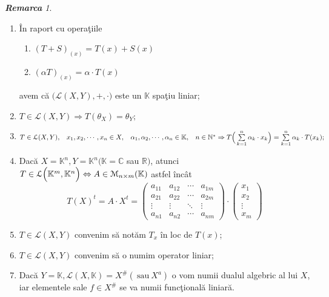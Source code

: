 \documentclass[ a4paper, 12pt]{report}
\theoremstyle{remark}
\newtheorem{remarc}{\bf Remarca}[section]
\numberwithin{equation}{section}
\begin{document}
\begin{remarc}
\begin{enumerate}
\item \^In raport cu opera\c tiile
\begin{enumerate}
\item $(T+S)_{(x)} = T(x) + S(x)$
\item $(\alpha T)_{(x)} = \alpha \cdot T(x)$
\end{enumerate} avem c\u a $\Big( \mathcal{L}(X,Y), + , \cdot\Big)$ este un $\mathbb{K}$ spa\c tiu liniar;
\item $T \in \mathcal{L}(X,Y) \Rightarrow T(\theta_{X}) = \theta_{Y};$
\item $T \in \mathcal{L}(X,Y),\hspace{3mm} x_1,x_2,\cdots,x_n \in X,\hspace{3mm} \alpha_1,\alpha_2, \cdots, \alpha_n \in \mathbb{K},\hspace{3mm} n \in \mathbb{N}^{\ast} \Rightarrow T\Big( \sum\limits_{k=1}^{n} \alpha_k \cdot x_k \Big) = \sum\limits_{k=1}^{n} \alpha_k \cdot T(x_k);$
\item Dac\u a $X = \mathbb{K}^{n}, Y = \mathbb{K}^{n} (\mathbb{K} = \mathbb{C}$ sau $\mathbb{R})$, atunci $T \in \mathcal{L}\Big( \mathbb{K}^{m}, \mathbb{K}^{n} \Big) \\ \Leftrightarrow A \in \mathcal{M}_{n \times m}(\mathbb{K})$ astfel \^inc\^at
\[ T(X)^{t} = A \cdot X^{t} = \begin{pmatrix}
  a_{11} & a_{12} & \cdots & a_{1m} \\
  a_{21} & a_{22} & \cdots & a_{2m} \\
  \vdots  & \vdots  & \ddots & \vdots  \\
  a_{n1} & a_{n2} & \cdots & a_{nm}
 \end{pmatrix} \cdot \begin{pmatrix}
 x_1\\
 x_2\\
 \vdots\\
 x_m
 \end{pmatrix}
\]
\item $T \in \mathcal{L}(X,Y)$ convenim s\u a not\u am $T_{x}$ \^in loc de $T(x)$;
\item $T \in \mathcal{L}(X,Y)$ convenim s\u a o numim operator liniar;
\item Dac\u a $Y = \mathbb{K},  \mathcal{L}(X,\mathbb{K}) = X^{\#} (\ \mbox{sau}\ X^{a})$ o vom numii dualul algebric al lui $X$, iar elementele sale $f \in X^{\#}$ se va numii func\c tional\u a liniar\u a.

\end{enumerate}
\end{remarc}
\end{document}
